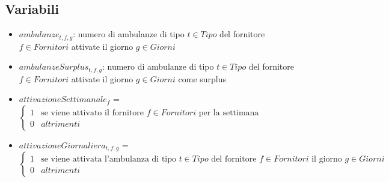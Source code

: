 \subsection{Variabili}
\begin{itemize}
    \item $ambulanze_{t, f, g}$: numero di ambulanze di tipo $t \in Tipo$ del fornitore $f \in Fornitori$ attivate il giorno $g \in Giorni$
    \item $ambulanzeSurplus_{t, f, g}$: numero di ambulanze di tipo $t \in Tipo$ del fornitore $f \in Fornitori$ attivate il giorno $g \in Giorni$ come surplus
    \item $attivazioneSettimanale_{f}$ = 
    \(
    \begin{cases}
        1 & \text{se viene attivato il fornitore $f \in Fornitori$ per la settimana} \\
        0 & altrimenti
    \end{cases}\)
    \item $attivazioneGiornaliera_{t, f, g}$ = 
    \(
    \begin{cases}
        1 & \text{se viene attivata l'ambulanza di tipo $t \in Tipo$ del fornitore $f \in Fornitori$ il giorno $g \in Giorni$} \\
        0 & altrimenti
    \end{cases}\)
\end{itemize}

